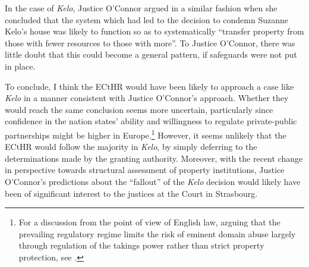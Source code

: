 In the case of {\it Kelo}, Justice O'Connor argued in a similar fashion when she concluded that the system which had led to the decision to condemn Suzanne Kelo's house was likely to function so as to systematically ``transfer property from those with fewer resources to those with more''. To Justice O'Connor, there was little doubt that this could become a general pattern, if safeguards were not put in place. %

To conclude, I think the ECtHR would have been likely to approach a case like {\it Kelo} in a manner consistent with Justice O'Connor's approach. Whether they would reach the same conclusion seems more uncertain, particularly since confidence in the nation states' ability and willingness to regulate private-public partnerships might be higher in Europe.\footnote{For a discussion from the point of view of English law, arguing that the prevailing regulatory regime limits the risk of eminent domain abuse largely through regulation of the takings power rather than strict property protection, see \cite{allen08}.} However, it seems unlikely that the ECtHR would follow the majority in {\it Kelo}, by simply deferring to the determinations made by the granting authority. Moreover, with the recent change in perspective towards structural assessment of property institutions, Justice O'Connor's predictions about the ``fallout'' of the {\it Kelo} decision would likely have been of significant interest to the justices at the Court in Strasbourg.

